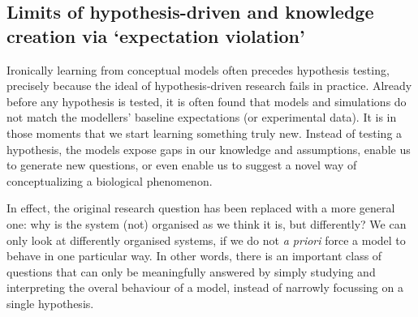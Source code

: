 \subsection{Limits of hypothesis-driven and knowledge creation via `expectation violation'}

Ironically learning from conceptual models often precedes hypothesis testing, precisely because the ideal of hypothesis-driven research fails in practice. Already before any hypothesis is tested, it is often found that models and simulations do not match the modellers’ baseline expectations (or experimental data). It is in those moments that we start learning something truly new. Instead of testing a hypothesis, the models expose gaps in our knowledge and assumptions, enable us to generate new questions, or even enable us to suggest a novel way of conceptualizing a biological phenomenon. 

In effect, the original research question has been replaced with a more general one: why is the system (not) organised as we think it is, but differently? We can only look at differently organised systems, if we do not \emph{a priori} force a model to behave in one particular way. In other words, there is an important class of questions that can only be meaningfully answered by simply studying and interpreting the overal behaviour of a model, instead of narrowly focussing on a single hypothesis.